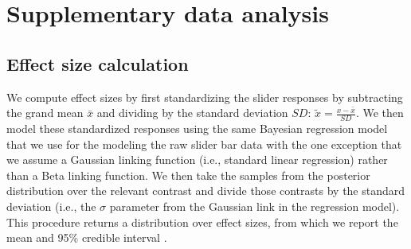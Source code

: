 \documentclass[floatsintext,doc]{apa6}
\begin{document}
\section{Supplementary data analysis}

\subsection{Effect size calculation}


We compute effect sizes by first standardizing the slider responses by subtracting the grand mean $\bar{x}$ and dividing by the standard deviation $SD$:  $\tilde{x} = \frac{x - \bar{x}}{SD}$.
We then model these standardized responses using the same Bayesian regression model that we use for the modeling the raw slider bar data with the one exception that we assume a Gaussian linking function (i.e., standard linear regression) rather than a Beta linking function. 
We then take the samples from the posterior distribution over the relevant contrast and divide those contrasts by the standard deviation (i.e., the $\sigma$ parameter from the Gaussian link in the regression model). 
This procedure returns a distribution over effect sizes, from which we report the mean and 95\% credible interval \cite{kruschke2014doing}. 
\end{document}
